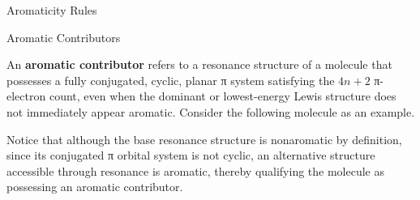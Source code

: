 \begin{core}[label=core:aromaticity_rules]{Aromaticity Rules}
\begin{enumerate}
      \end{enumerate}

    \end{core}

    \begin{core}{Aromatic Contributors}

      An \textbf{aromatic contributor} refers to a resonance structure of a molecule that possesses a fully conjugated, cyclic, planar π system satisfying the $4n+2$ π-electron count, even when the dominant or lowest-energy Lewis structure does not immediately appear aromatic. Consider the following molecule as an example.


      Notice that although the base resonance structure is nonaromatic by definition, since its conjugated π orbital system is not cyclic, an alternative structure accessible through resonance is aromatic, thereby qualifying the molecule as possessing an aromatic contributor.

    \end{core}

